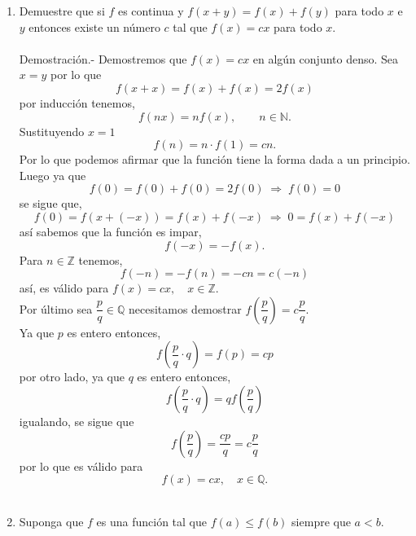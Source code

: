 \begin{enumerate}[\bfseries 1.]
\begin{enumerate}[\bfseries (a)]
	\end{enumerate}

    \item Demuestre que si $f$ es continua y $f(x+y)=f(x)+f(y)$ para todo $x$ e $y$ entonces existe un número $c$ tal que $f(x)=cx$ para todo $x$.\\\\
	Demostración.-\; Demostremos que $f(x)=cx$ en algún conjunto denso. Sea $x=y$ por lo que 
	$$f(x+x)=f(x)+f(x)=2f(x)$$
	por inducción tenemos,
	$$f(nx)=nf(x),\qquad n\in \mathbb{N}.$$
	Sustituyendo $x=1$
	$$f(n)=n\cdot f(1)=cn.$$
	Por lo que podemos afirmar que la función tiene la forma dada a un principio.\\
	Luego ya que 
	$$f(0)=f(0)+f(0)=2f(0)\; \Longrightarrow \; f(0)=0$$
	se sigue que,
	$$f(0)=f(x+(-x))=f(x)+f(-x)\; \Longrightarrow \; 0=f(x)+f(-x)$$
	así sabemos que la función es impar, 
	$$f(-x)=-f(x).$$
	Para $n\in \mathbb{Z}$ tenemos,
	$$f(-n)=-f(n)=-cn=c(-n)$$
	así, es válido para
	$f(x)=cx,\quad x\in \mathbb{Z}.$\\
	Por último sea $\dfrac{p}{q}\in \mathbb{Q}$ necesitamos demostrar $f\left(\dfrac{p}{q}\right)=c\dfrac{p}{q}$.\\
	Ya que $p$ es entero entonces,
	$$f\left(\dfrac{p}{q}\cdot q\right)=f(p)=cp$$
	por otro lado, ya que $q$ es entero entonces,
	$$f\left(\dfrac{p}{q}\cdot q\right)=qf\left(\dfrac{p}{q}\right)$$
	igualando, se sigue que 
	$$f\left(\dfrac{p}{q}\right)=\dfrac{cp}{q}=c\dfrac{p}{q}$$
	por lo que es válido para
	$$f(x)=cx,\quad x\in \mathbb{Q}.$$\\


    \item Suponga que $f$ es una función tal que $f(a)\leq f(b)$ siempre que $a<b$.\\

		\begin{center}
		\end{center}
		\vspace{.5cm}


\end{enumerate}
